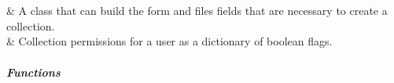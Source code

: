 \documentclass[letterpaper,10pt,english]{sphinxmanual}
\begin{document}
\begin{savenotes}\sphinxatlongtablestart\begin{longtable}[c]{}
\hline

\endfirsthead

%
{}\\
\hline

\endhead

\hline
{}\\
\endfoot

\endlastfoot

\sphinxAtStartPar
{\hyperref[\detokenize{autoapi/pine/client/models/index:pine.client.models.CollectionBuilder}]{}}
&
\sphinxAtStartPar
A class that can build the form and files fields that are necessary to create a collection.
\\
\hline
\sphinxAtStartPar
{\hyperref[\detokenize{autoapi/pine/client/models/index:pine.client.models.CollectionUserPermissions}]{}}
&
\sphinxAtStartPar
Collection permissions for a user as a dictionary of boolean flags.
\\
\hline
\end{longtable}\sphinxatlongtableend\end{savenotes}


\subparagraph{Functions}
\label{\detokenize{autoapi/pine/client/models/index:functions}}
\end{document}
